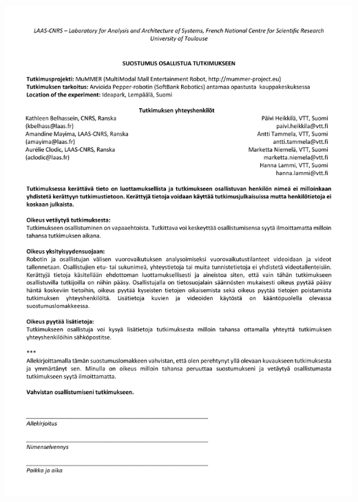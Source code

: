 \begin{center}
	\includegraphics[page=1, width=\textwidth]{figures/annexe1/consent_form_finnish.pdf} 
\end{center}

